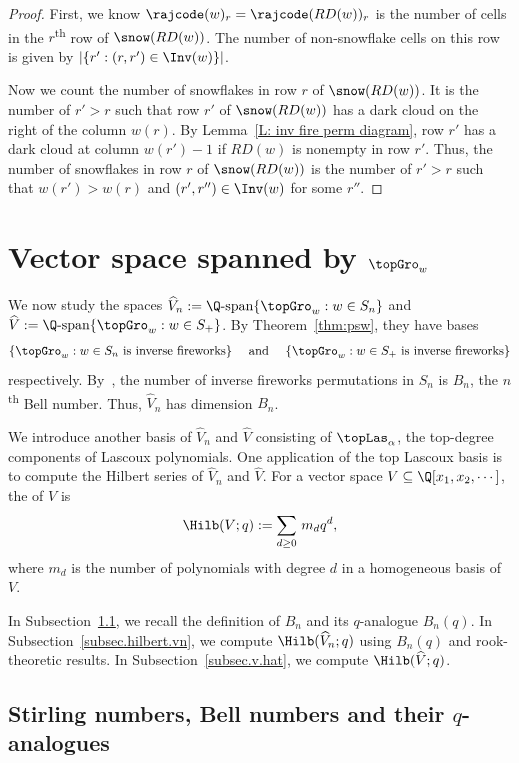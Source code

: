 \begin{proof}
First, we know $\rajcode(w)_r = \rajcode(RD(w))_r$
is the number of cells in the $r$\textsuperscript{th}  row of $\snow(RD(w))$.
The number of non-snowflake cells
on this row is given by $|\{r': (r, r') \in \Inv(w)\}|$.

Now we count the number of snowflakes 
in row $r$ of $\snow(RD(w))$.
It is the number of $r' > r$
such that row $r'$ of $\snow(RD(w))$ has a dark cloud
on the right of the column $w(r)$.
By Lemma~\ref{L: inv fire perm diagram}, 
row $r'$ has a dark cloud 
at column $w(r') - 1$ if $RD(w)$ is nonempty in row $r'$.
Thus, the number of snowflakes 
in row $r$ of $\snow(RD(w))$ is the number of $r' > r$
such that $w(r') > w(r)$ and $(r', r'') \in \Inv(w)$
for some $r''$.
\end{proof}


\section{Vector space spanned by \texorpdfstring{$\topGro_w$}{TEXT}}\label{S: Space}

We now study the spaces
$\widehat{V}_n := \Q\textrm{-span}\{\topGro_w: w \in S_n\}$
and $\widehat{V} := \Q\textrm{-span}\{\topGro_w: w \in S_+\}$.
By Theorem~\ref{thm:psw},
they have bases
$$\{\topGro_w: w \in S_n 
\textrm{ is inverse fireworks}\}  
\quad\textrm{ and }\quad 
\{\topGro_w: w \in S_+ \textrm{ is inverse fireworks}\}
$$
respectively. 
By~\cite{Cla}, 
the number of inverse fireworks permutations in $S_n$
is $B_n$, the $n$\textsuperscript{th} Bell number.
Thus, $\widehat{V}_n$ has dimension $B_n$.

We introduce another basis of $\widehat{V}_n$ and $\widehat{V}$ 
consisting of $\topLas_\alpha$, the top-degree components of Lascoux polynomials.
One application of 
the top Lascoux basis 
is to compute the Hilbert series of $\widehat{V}_n$
and $\widehat{V}$.
For a vector space $V \subseteq \Q[x_1, x_2, \cdots]$,
the  of $V$ is 
$$\Hilb(V;q) := \sum_{d \geq 0}\, m_d q^d,$$
where $m_d$ is the number of polynomials 
with degree $d$ in a homogeneous 
basis of $V$.


In Subsection~\ref{SS: Bell},
we recall the definition of $B_n$ and its $q$-analogue $B_n(q)$. 
In Subsection~\ref{subsec.hilbert.vn}, we compute $\Hilb(\widehat{V}_n;q)$ 
using $B_n(q)$ and rook-theoretic results. 
In Subsection~\ref{subsec.v.hat},
we compute $\Hilb(\widehat{V};q)$.


\subsection{Stirling numbers, Bell numbers
and their \texorpdfstring{$q$}{TEXT}-analogues}
\label{SS: Bell}


